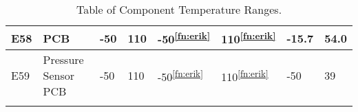 \begin{longtable}{|m{1cm}|m{3.5cm}|m{1.3cm}|m{1.3cm}|m{1.4cm}|m{1.3cm}|m{1.3cm}|m{1.3cm}|}
E58 & PCB & -50 & 110 & -50\textsuperscript{\ref{fn:erik}} & 110\textsuperscript{\ref{fn:erik}} & -15.7 & 54.0 \\ \hline
E59 & Pressure Sensor PCB & -50 & 110 & -50\textsuperscript{\ref{fn:erik}} & 110\textsuperscript{\ref{fn:erik}} & -50 & 39 \\ \hline


\caption{Table of Component Temperature Ranges.}
\label{tab:thermal-table}
\end{longtable}
\raggedbottom








